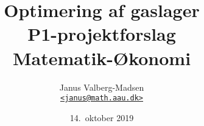 \documentclass[12pt,a4paper,oneside,final]{article}
\title{
  Optimering af gaslager\\
  \large P1-projektforslag \\
  Matematik-{\O}konomi
}
\author{
  Janus Valberg-Madsen\\
  \href{mailto:janus@math.aau.dk}{\texttt{<janus@math.aau.dk>}}
}
\date{14.\ oktober 2019}
\begin{document}
\maketitle

\begin{center}
  
\end{center}

\tableofcontents








\end{document}
